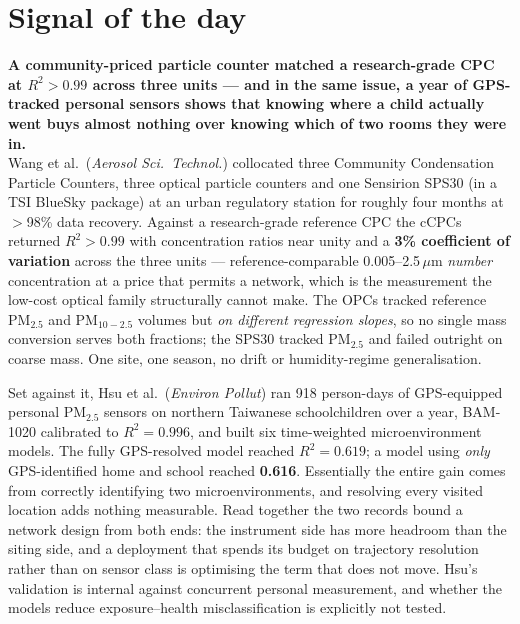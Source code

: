 \documentclass[10pt]{article}
\begin{document}
\vspace{6mm}

\section*{\sffamily\bfseries\color{Deep}Signal of the day}
\vspace{-1.5mm}{\color{Amber}\rule{\linewidth}{1.1pt}}\vspace{2.5mm}

\begin{keybox}
{\sffamily\bfseries\small\color{Deep}A community-priced particle counter matched a
research-grade CPC at $R^2>0.99$ across three units --- and in the same issue, a year of
GPS-tracked personal sensors shows that knowing where a child actually went buys almost
nothing over knowing which of two rooms they were in.}\\[1.4mm]
\footnotesize
Wang et al.\ (\textit{Aerosol Sci.\ Technol.}) collocated three Community Condensation
Particle Counters, three optical particle counters and one Sensirion SPS30 (in a TSI
BlueSky package) at an urban regulatory station for roughly four months at
$>$98\% data recovery. Against a research-grade reference CPC the cCPCs returned
$R^2>0.99$ with concentration ratios near unity and a \textbf{3\% coefficient of variation}
across the three units --- reference-comparable 0.005--2.5\,$\mu$m \emph{number}
concentration at a price that permits a network, which is the measurement the low-cost
optical family structurally cannot make. The OPCs tracked reference PM$_{2.5}$ and
PM$_{10-2.5}$ volumes but \emph{on different regression slopes}, so no single mass
conversion serves both fractions; the SPS30 tracked PM$_{2.5}$ and failed outright on
coarse mass. One site, one season, no drift or humidity-regime generalisation.\par
\vspace{1.2mm}
Set against it, Hsu et al.\ (\textit{Environ Pollut}) ran 918 person-days of GPS-equipped
personal PM$_{2.5}$ sensors on northern Taiwanese schoolchildren over a year, BAM-1020
calibrated to $R^2=0.996$, and built six time-weighted microenvironment models. The fully
GPS-resolved model reached $R^2=0.619$; a model using \emph{only} GPS-identified home and
school reached \textbf{0.616}. Essentially the entire gain comes from correctly identifying
two microenvironments, and resolving every visited location adds nothing measurable. Read
together the two records bound a network design from both ends: the instrument side has
more headroom than the siting side, and a deployment that spends its budget on trajectory
resolution rather than on sensor class is optimising the term that does not move. Hsu's
validation is internal against concurrent personal measurement, and whether the models
reduce exposure--health misclassification is explicitly not tested.
\end{keybox}
\end{document}
